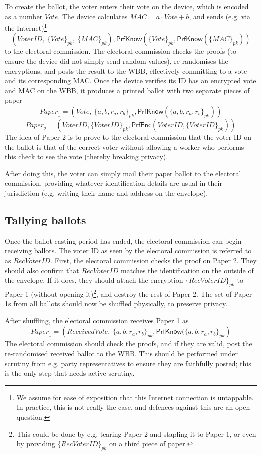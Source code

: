 \documentclass[12pt,a4paper]{article}
\newcommand{\PrfEnc}{\mathsf{PrfEnc}}
\newcommand{\PrfKnow}{\mathsf{PrfKnow}}
\theoremstyle{definition}
\newcommand{\Vote}{\mathit{Vote}}
\newcommand{\VoterID}{\mathit{VoterID}}
\newcommand{\receivedvid}{\mathit{RecVoterID}}
\newcommand{\Paper}{\mathit{Paper}}
\newcommand{\Mac}{\mathit{MAC}}
\begin{document}
To create the ballot, the voter enters their vote on the device, which is encoded as a number $\Vote$. The device calculates $\Mac=a\cdot \Vote+b$, and sends (e.g. via the Internet)\footnote{We assume for ease of exposition that this Internet connection is untappable. In practice, this is not really the case, and defences against this are an open question.}
$$\left(\VoterID,\ \{\Vote\}_{pk},\ \{\Mac\}_{pk}\right), \PrfKnow(\{\Vote\}_{pk}, \PrfKnow(\{\Mac\}_{pk}))$$
to the electoral commission. The electoral commission checks the proofs (to ensure the device did not simply send random values), re-randomises the encryptions, and posts the result to the WBB, effectively committing to a vote and its corresponding MAC. Once the device verifies its ID has an encrypted vote and MAC on the WBB, it produces a printed ballot with two separate pieces of paper
$$\Paper_1 = \left(\Vote,\ \{a,b,r_a,r_b\}_{pk}, \PrfKnow(\{a,b,r_a,r_b\}_{pk})\right)$$
$$\Paper_2 = \left(\VoterID, \{\VoterID\}_{pk}, \PrfEnc(\VoterID, \{\VoterID\}_{pk})\right)$$
The idea of Paper 2 is to prove to the electoral commission that the voter ID on the ballot is that of the correct voter without allowing a worker who performs this check to see the vote (thereby breaking privacy).

After doing this, the voter can simply mail their paper ballot to the electoral commission, providing whatever identification details are usual in their jurisdiction (e.g. writing their name and address on the envelope).
\subsection{Tallying ballots}
Once the ballot casting period has ended, the electoral commission can begin receiving ballots. The voter ID as seen by the electoral commission is referred to as $\receivedvid$. First, the electoral commission checks the proof on Paper 2. 
They should also confirm that $\receivedvid$ matches the identification on the outside of the envelope. If it does, they should attach the encryption $\{\receivedvid\}_{pk}$ to Paper 1 (without opening it)\footnote{This could be done by e.g. tearing Paper 2 and stapling it to Paper 1, or even by providing $\{\receivedvid\}_{pk}$ on a third piece of paper.}, and destroy the rest of Paper 2. The set of Paper 1s from all ballots should now be shuffled physically, to preserve privacy.

After shuffling, the electoral commission receives Paper 1 as
$$\Paper_1=\left(ReceivedVote,\ \{a,b,r_a,r_b\}_{pk}, \PrfKnow(\{a,b,r_a,r_b\}_{pk}\right)$$
The electoral commission should check the proofs, and if they are valid, post the re-randomised received ballot to the WBB. This should be performed under scrutiny from e.g. party representatives to ensure they are faithfully posted; this is the only step that needs active scrutiny.
\end{document}
